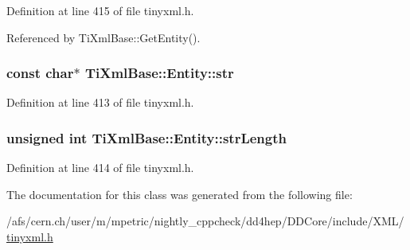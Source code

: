 Definition at line 415 of file tinyxml.h.

Referenced by TiXmlBase::GetEntity().\hypertarget{struct_ti_xml_base_1_1_entity_ab721b5d4f7ed144ffd215947b38258b7}{
\subsubsection[{str}]{\setlength{\rightskip}{0pt plus 5cm}const char$\ast$ {\bf TiXmlBase::Entity::str}}}
\label{struct_ti_xml_base_1_1_entity_ab721b5d4f7ed144ffd215947b38258b7}


Definition at line 413 of file tinyxml.h.\hypertarget{struct_ti_xml_base_1_1_entity_a22e8d820894d3360b01fed110badb876}{
\subsubsection[{strLength}]{\setlength{\rightskip}{0pt plus 5cm}unsigned int {\bf TiXmlBase::Entity::strLength}}}
\label{struct_ti_xml_base_1_1_entity_a22e8d820894d3360b01fed110badb876}


Definition at line 414 of file tinyxml.h.

The documentation for this class was generated from the following file:\begin{DoxyCompactItemize}
\item 
/afs/cern.ch/user/m/mpetric/nightly\_\-cppcheck/dd4hep/DDCore/include/XML/\hyperlink{tinyxml_8h}{tinyxml.h}\end{DoxyCompactItemize}
